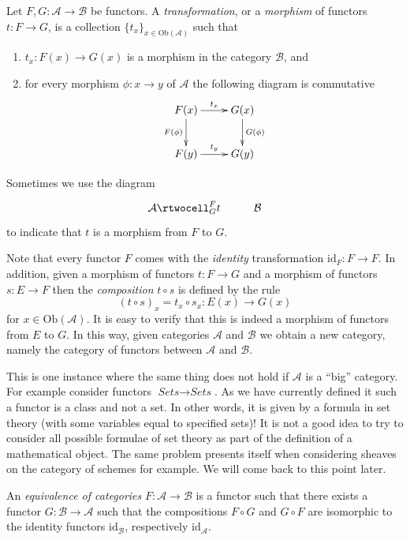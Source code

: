 \begin{definition}
Let $F, G : \mathcal{A} \to \mathcal{B}$ be functors.
A {\it transformation}, or a {\it morphism} of functors
$t : F \to G$, is a collection $\{t_x\}_{x\in \text{Ob}(\mathcal{A})}$
such that
\begin{enumerate}
\item $t_x : F(x) \to G(x)$ is a morphism in the category $\mathcal{B}$, and
\item for every morphism $\phi : x \to y$ of $\mathcal{A}$ the following
diagram is commutative
$$
\xymatrix{
F(x) \ar[r]^{t_x} \ar[d]_{F(\phi)} & G(x) \ar[d]^{G(\phi)} \\
F(y) \ar[r]^{t_y} & G(y) }
$$
\end{enumerate}
\end{definition}

\noindent
Sometimes we use the diagram
$$\xymatrix{
\mathcal{A}
\rtwocell^F_{G}{t}
&
\mathcal{B}
}
$$
to indicate that $t$ is a morphism from $F$ to $G$.

\medskip\noindent
Note that every functor $F$ comes with the {\it identity} transformation
$\text{id}_F : F \to F$. In addition, given a morphism of
functors $t : F \to G$ and a morphism of functors $s : E \to F$
then the {\it composition} $t \circ s$ is defined by the rule
$$
(t \circ s)_x = t_x \circ s_x : E(x) \to G(x)
$$
for $x \in \text{Ob}(\mathcal{A})$.
It is easy to verify that this is indeed a morphism of functors
from $E$ to $G$.
In this way, given categories 
$\mathcal{A}$ and $\mathcal{B}$ we obtain a new category,
namely the category of functors between $\mathcal{A}$ and
$\mathcal{B}$.

\begin{remark}
This is one instance where the same thing does not hold if
$\mathcal{A}$ is a ``big'' category. For example consider
functors $\textit{Sets} \to \textit{Sets}$. As we have currently
defined it such a functor is a class and not a set. In other
words, it is given by a formula in set theory (with some variables
equal to specified sets)! It is not a good idea to try to consider
all possible formulae of set theory as part of the definition of 
a mathematical object. The same problem presents itself when
considering sheaves on the category of schemes for example.
We will come back to this point later.
\end{remark}

\begin{definition}
\label{definiton-equivalence-categories}
An {\it equivalence of categories}
$F : \mathcal{A} \to \mathcal{B}$ is a functor such that there
exists a functor $G : \mathcal{B} \to \mathcal{A}$ such that
the compositions $F \circ G$ and $G \circ F$ are isomorphic to the
identity functors $\text{id}_\mathcal{B}$,
respectively $\text{id}_\mathcal{A}$.
\end{definition}

